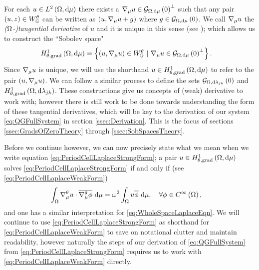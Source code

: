 For each $u\in L^{2}\left( \Omega,\mathrm{d}\mu \right)$ there exists a $\nabla_\mu u\in\mathcal{G}_{ \Omega, \mathrm{d}\mu}\left( 0 \right)^{\perp}$ such that any pair $\left( u,z \right)\in W^{\theta}_{\mathbb{G}}$ can be written as $\left( u,\nabla_\mu u + g \right)$ where $g\in\mathcal{G}_{ \Omega, \mathrm{d}\mu}\left( 0 \right)$.
We call $\nabla_\mu u$ the \emph{($\Omega$-)tangential derivative} of $u$ and it is unique in this sense (see ); which allows us to construct the ``Sobolev space"
\begin{align*}
	H^1_{\theta, \mathrm{grad}}\left( \Omega, \mathrm{d}\mu \right) &= \left\{  \left( u, \nabla_\mu u \right)\in W^{\theta}_{\mathbb{G}} \ \vert \ \nabla_\mu u \in \mathcal{G}_{ \Omega, \mathrm{d}\mu}\left( 0 \right)^{\perp}  \right\}.
\end{align*}
Since $\nabla_\mu u$ is unique, we will use the shorthand $u\in H^1_{\theta, \mathrm{grad}}\left( \Omega, \mathrm{d}\mu \right)$ to refer to the pair $\left( u, \nabla_\mu u \right)$. 
We can follow a similar process to define the sets $\mathcal{G}_{ \Omega, \mathrm{d}\lambda_{jk}}\left( 0 \right)$ and $H^1_{\theta, \mathrm{grad}}\left( \Omega, \mathrm{d}\lambda_{jk} \right)$. 
These constructions give us concepts of (weak) derivative to work with; however there is still work to be done towards understanding the form of these tangential derivatives, which will be key to the derivation of our system \eqref{eq:QGFullSystem} in section \ref{ssec:Derivation}.
This is the focus of sections \ref{ssec:GradsOfZeroTheory} through \ref{ssec:SobSpacesTheory}. \newline

Before we continue however, we can now precisely state what we mean when we write equation \eqref{eq:PeriodCellLaplaceStrongForm}; a pair $u\in H^1_{\theta, \mathrm{grad}}\left( \Omega, \mathrm{d}\mu \right)$ solves \eqref{eq:PeriodCellLaplaceStrongForm} if and only if (see \eqref{eq:PeriodCellLaplaceWeakForm})
\begin{align*}
	\int_{\Omega}\nabla^{\theta}_{\mu}u\cdot\overline{\nabla^{\theta}_{\mu}\phi} \ \mathrm{d}\mu &= \omega^2\int_{\Omega}u\overline{\phi} \ \mathrm{d}\mu, \quad\forall \phi\in C^{\infty}\left( \Omega \right),
\end{align*}
and one has a similar interpretation for \eqref{eq:WholeSpaceLaplaceEqn}.
We will continue to use \eqref{eq:PeriodCellLaplaceStrongForm} as shorthand for \eqref{eq:PeriodCellLaplaceWeakForm} to save on notational clutter and maintain readability, however naturally the steps of our derivation of \eqref{eq:QGFullSystem} from \eqref{eq:PeriodCellLaplaceStrongForm} requires us to work with \eqref{eq:PeriodCellLaplaceWeakForm} directly.

